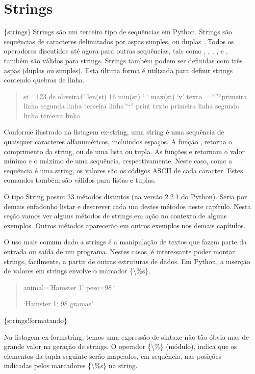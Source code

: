 \documentclass[a4paper,10pt,brazil]{sphinxmanual}
\begin{document}
\section{Strings}
\label{Cap2:strings}
\{strings\} Strings são um terceiro tipo de sequências em Python.
Strings são sequências de caracteres delimitados por aspas simples,
 ou duplas . Todos os operadores
discutidos até agora para outras sequências, tais como \code{+},
\code{*}, , ,  e , também são
válidos para strings. Strings também podem ser definidas com três
aspas (duplas ou simples). Esta última forma é utilizada para
definir strings contendo quebras de linha.
\begin{quote}

st=`123 de oliveira4' len(st) 16 min(st) ` ` max(st) `v' texto =
``''``primeira linha segunda linha terceira linha''``'' print texto
primeira linha segunda linha terceira linha
\end{quote}

Conforme ilustrado na listagem ex-string, uma string é uma
sequência de quaisquer caracteres alfanuméricos, incluindos
espaços. A função , retorna o comprimento da string, ou de
uma lista ou tupla. As funções  e  retornam o
valor mínimo e o máximo de uma sequência, respectivamente. Neste
caso, como a sequência é uma string, os valores são os códigos
ASCII de cada caracter. Estes comandos também são válidos para
listas e tuplas.

O tipo String possui 33 métodos distintos (na versão 2.2.1 do
Python). Seria por demais enfadonho listar e descrever cada um
destes métodos neste capítulo. Nesta seção vamos ver alguns métodos
de strings em ação no contexto de alguns exemplos. Outros métodos
aparecerão em outros exemplos nos demais capítulos.

O uso mais comum dado a strings é a manipulação de textos que fazem
parte da entrada ou saída de um programa. Nestes casos, é
interessante poder montar strings, facilmente, a partir de outras
estruturas de dados. Em Python, a inserção de valores em strings
envolve o marcador \{\textbackslash{}\%s\}.
\begin{quote}

animal='Hamster 1' peso=98 `

`Hamster 1: 98 gramas'
\end{quote}

\{strings!formatando\}

Na listagem ex-formstring, temos uma expressão de sintaxe não tão
óbvia mas de grande valor na geração de strings. O operador \{\textbackslash{}\%\}
(módulo), indica que os elementos da tupla seguinte serão mapeados,
em sequência, nas posições indicadas pelos marcadores \{\textbackslash{}\%s\} na
string.
\end{document}
